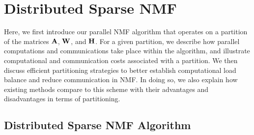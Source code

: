\section{Distributed Sparse NMF}


Here, we first introduce our parallel NMF algorithm that operates on a partition of the matrices $\mathbf{A}$, $\mathbf{W}$, and $\mathbf{H}$.
For a given partition, we describe how parallel computations and communications take place within the algorithm, and illustrate computational and communication costs associated with a partition.
We then discuss efficient partitioning strategies to better establish computational load balance and reduce communication in NMF.
In doing so, we also explain how existing methods compare to this scheme with their advantages and disadvantages in terms of partitioning.

\subsection{Distributed Sparse NMF Algorithm}


